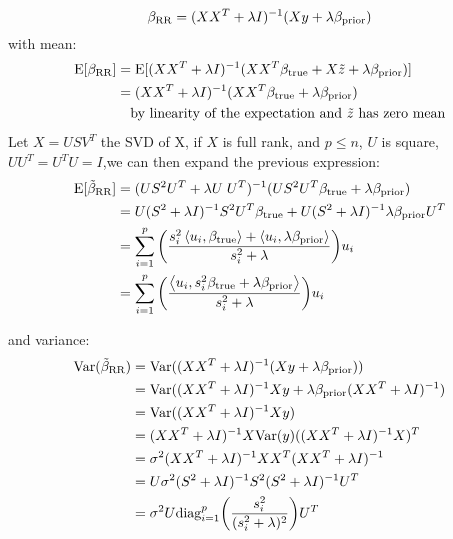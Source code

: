 \documentclass[12pt,twoside]{article}
\begin{document}
\begin{enumerate}
\begin{enumerate}
  $$\beta_{\operatorname{RR}}  =   (X X^T  +  \lambda I)^{-1} (X y + \lambda \beta_{\operatorname{prior}})$$
  with mean:
\begin{align*}
  	\mathrm{E}[\beta_{\operatorname{RR}} ]		&= 		\mathrm{E}[ (X X^T  +  \lambda I)^{-1} (X X^T \beta_{\operatorname{true}} + X \tilde{ z } +  \lambda \beta_{\operatorname{prior}})] \\
						&=		 (X X^T  +  \lambda I)^{-1} (X X^T \beta_{\operatorname{true}}  + \lambda \beta_{\operatorname{prior}}) \\
						&	\text{ ~ by linearity of the expectation and } \tilde{ z } \text{ has zero mean}
\end{align*} 
Let $X=U S V^T$ the SVD of X, if $X$ is full rank, and $p \le n$, $U$ is square, $UU^T= U^TU = I$,we can then expand the previous expression:
\begin{align*}
	\mathrm{E}[\tilde{\beta}_{\operatorname{RR}} ]		&=	(U S^2 U^T + \lambda U \; U^T)^{-1}	(U S^2 U^T \beta_{\operatorname{true}}  + \lambda \beta_{\operatorname{prior}}) \\
							&=	U (S^2 + \lambda I)^{-1} S^2 U^T  \beta_{\operatorname{true}}  + U (S^2 + \lambda I)^{-1}  \lambda \beta_{\operatorname{prior}} U^T \\
							&=	\sum_{i=1}^p \bigg( \frac{s_i^2 \left \langle u_i, \beta_{\operatorname{true}} \right \rangle + \left \langle u_i,  \lambda \beta_{\operatorname{prior}}\right \rangle} {s_i^2 + \lambda} \bigg) u_i \\
							&=	\sum_{i=1}^p \bigg(   \frac{ \left \langle u_i, s_i^2 \beta_{\operatorname{true}} +  \lambda \beta_{\operatorname{prior}} \right \rangle}  {s_i^2 + \lambda} \bigg) u_i
\end{align*} 

and variance:	
\begin{align*}
	\Var(\tilde{\beta}_{\op{RR}})	&=	\Var( (X X^T  +  \lambda I)^{-1} (X y + \lambda \beta_{\op{prior}})) \\
						&=	\Var( (X X^T  +  \lambda I)^{-1}  X y + \lambda  \beta_{\op{prior}} (X X^T  +  \lambda I)^{-1} ) \\
						&=	\Var( (X X^T  +  \lambda I)^{-1}  X y) \\
						&=	(X X^T  +  \lambda I)^{-1}  X \var(y)	((X X^T  +  \lambda I)^{-1}  X)^T \\
						&=	\sigma^2 (X X^T  +  \lambda I)^{-1}  X X^T (X X^T  +  \lambda I)^{-1} \\
						&=	U \sigma^2 (S^2 + \lambda I)^{-1} S^2 (S^2 + \lambda I)^{-1} U^T \\
						&= 	\sigma^2 	U  \text{diag}_{i=1}^p \bigg( \frac{s_i^2} {(s_i^2 + \lambda)^2} \bigg) 	U^T
\end{align*}					
   

\end{enumerate}
\end{enumerate}
\end{document}
